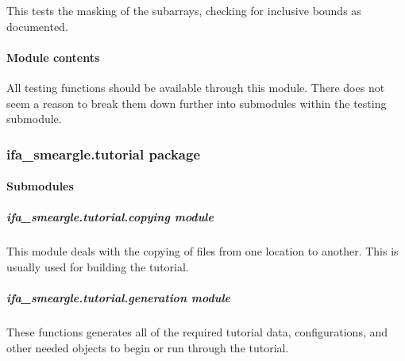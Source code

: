 \documentclass[letterpaper,10pt,english]{sphinxmanual}
\begin{document}
\begin{fulllineitems}
\label{\detokenize{docstrings/ifa_smeargle.testing.test_numerical_masking:ifa_smeargle.testing.test_numerical_masking.test_mask_subarray}}
This tests the masking of the sub\sphinxhyphen{}arrays, checking for
inclusive bounds as documented.

\end{fulllineitems}



\paragraph{Module contents}
\label{\detokenize{docstrings/ifa_smeargle.testing:module-ifa_smeargle.testing}}\label{\detokenize{docstrings/ifa_smeargle.testing:module-contents}}
All testing functions should be available through this module. There
does not seem a reason to break them down further into submodules
within the testing submodule.


\subsubsection{ifa\_smeargle.tutorial package}
\label{\detokenize{docstrings/ifa_smeargle.tutorial:ifa-smeargle-tutorial-package}}\label{\detokenize{docstrings/ifa_smeargle.tutorial::doc}}

\paragraph{Submodules}
\label{\detokenize{docstrings/ifa_smeargle.tutorial:submodules}}

\subparagraph{ifa\_smeargle.tutorial.copying module}
\label{\detokenize{docstrings/ifa_smeargle.tutorial.copying:module-ifa_smeargle.tutorial.copying}}\label{\detokenize{docstrings/ifa_smeargle.tutorial.copying:ifa-smeargle-tutorial-copying-module}}\label{\detokenize{docstrings/ifa_smeargle.tutorial.copying::doc}}
This module deals with the copying of files from one location to
another. This is usually used for building the tutorial.


\subparagraph{ifa\_smeargle.tutorial.generation module}
\label{\detokenize{docstrings/ifa_smeargle.tutorial.generation:module-ifa_smeargle.tutorial.generation}}\label{\detokenize{docstrings/ifa_smeargle.tutorial.generation:ifa-smeargle-tutorial-generation-module}}\label{\detokenize{docstrings/ifa_smeargle.tutorial.generation::doc}}
These functions generates all of the required tutorial data,
configurations, and other needed objects to begin or run through
the tutorial.
\end{document}
